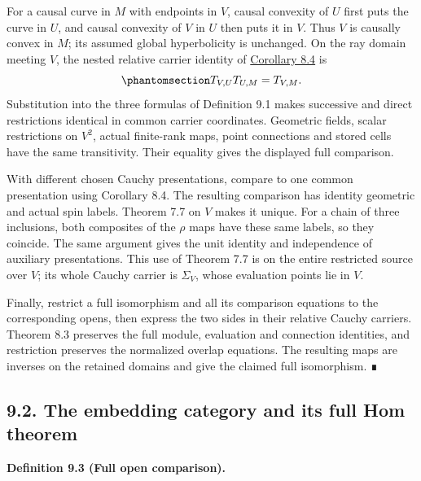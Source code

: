 \documentclass[
  english,
  11pt,
  reqno]{amsart}
\makeatletter
\newcommand{\paperdisplaynext}{%
  \let\paper@savedstartsection\@startsection
  \def\@startsection##1##2##3##4##5##6{%
    \let\@startsection\paper@savedstartsection
    \@tempskipa ##5\relax
    \ifdim\@tempskipa<\z@
      \def\paper@afterskip{.35\baselineskip}%
    \else
      \def\paper@afterskip{##5}%
    \fi
    \@startsection{##1}{##2}{##3}{##4}{\paper@afterskip}{##6}}}
\newcommand{\paperdisplaysection}{\paperdisplaynext\subsection}
\newcommand{\pandocstatementheading}[1]{%
  \par\if@nobreak\else
    \addpenalty{\@beginparpenalty}%
    \addvspace{.5\baselineskip plus .2\baselineskip minus .2\baselineskip}%
  \fi
  {\normalfont\bfseries #1\par}%
  \nobreak\@afterindenttrue\@afterheading
}
\makeatother
\begin{document}
For a causal curve in \(M\) with endpoints in \(V\), causal convexity of
\(U\) first puts the curve in \(U\), and causal convexity of \(V\) in
\(U\) then puts it in \(V\). Thus \(V\) is causally convex in \(M\); its
assumed global hyperbolicity is unchanged. On the ray domain meeting
\(V\), the nested relative carrier identity of
\hyperref[cor:relative-carrier-coherence]{Corollary 8.4} is
\begin{equation}\protect\phantomsection\label{eq:global-open-carrier-nested-identity}{
T_{V,U}T_{U,M}=T_{V,M}.
}\end{equation} Substitution into the three formulas of Definition 9.1
makes successive and direct restrictions identical in common carrier
coordinates. Geometric fields, scalar restrictions on \(V^2\), actual
finite-rank maps, point connections and stored cells have the same
transitivity. Their equality gives the displayed full comparison.

With different chosen Cauchy presentations, compare to one common
presentation using Corollary 8.4. The resulting comparison has identity
geometric and actual spin labels. Theorem 7.7 on \(V\) makes it unique.
For a chain of three inclusions, both composites of the \(\rho\) maps
have these same labels, so they coincide. The same argument gives the
unit identity and independence of auxiliary presentations. This use of
Theorem 7.7 is on the entire restricted source over \(V\); its whole
Cauchy carrier is \(\Sigma_V\), whose evaluation points lie in \(V\).

Finally, restrict a full isomorphism and all its comparison equations to
the corresponding opens, then express the two sides in their relative
Cauchy carriers. Theorem 8.3 preserves the full module, evaluation and
connection identities, and restriction preserves the normalized overlap
equations. The resulting maps are inverses on the retained domains and
give the claimed full isomorphism. ∎

\protect{}\label{sec:global-source-embedding-hom}
\paperdisplaysection{9.2. The embedding category and its full Hom
theorem}\label{the-embedding-category-and-its-full-hom-theorem}
\pandocstatementheading{\protect{}\label{def:global-full-source-open-embedding}Definition 9.3 (Full open comparison).}
\end{document}
